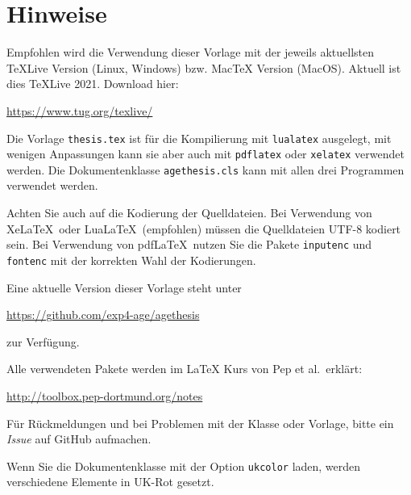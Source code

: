 \thispagestyle{empty}
\setcounter{page}{2}
\section*{Hinweise}
Empfohlen wird die Verwendung dieser Vorlage mit der jeweils aktuellsten TeXLive Version (Linux, Windows) bzw. MacTeX Version (MacOS).
Aktuell ist dies TeXLive 2021. Download hier:
\begin{center}
  \ttfamily\url{https://www.tug.org/texlive/}
\end{center}

Die Vorlage \texttt{thesis.tex} ist für die Kompilierung mit \texttt{lualatex} ausgelegt, mit wenigen Anpassungen kann sie aber auch mit \texttt{pdflatex} oder \texttt{xelatex} verwendet werden.
Die Dokumentenklasse \texttt{agethesis.cls} kann mit allen drei Programmen verwendet werden.

Achten Sie auch auf die Kodierung der Quelldateien.
Bei Verwendung von Xe\LaTeX\ oder Lua\LaTeX\ (empfohlen) müssen die
Quelldateien UTF-8 kodiert sein.
Bei Verwendung von pdf\LaTeX\ nutzen Sie die Pakete \texttt{inputenc} und \texttt{fontenc} mit der korrekten Wahl der Kodierungen.

Eine aktuelle Version dieser Vorlage steht unter 
\begin{center}
  \ttfamily\url{https://github.com/exp4-age/agethesis}
\end{center}
zur Verfügung.

Alle verwendeten Pakete werden im \LaTeX{} Kurs von Pep et al.\ erklärt:
\begin{center}
  \ttfamily\url{http://toolbox.pep-dortmund.org/notes}
\end{center}

Für Rückmeldungen und bei Problemen mit der Klasse oder Vorlage, bitte ein \emph{Issue} auf GitHub aufmachen.

Wenn Sie die Dokumentenklasse mit der Option \texttt{ukcolor} laden, werden verschiedene Elemente in UK-Rot gesetzt.
